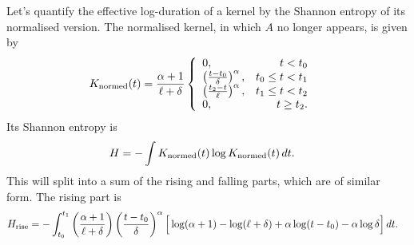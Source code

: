 \documentclass[a4paper, 12pt]{article}
\begin{document}
Let's quantify the effective log-duration of a kernel by the Shannon entropy of
its normalised version. The normalised kernel, in which $A$ no longer appears,
is given by
\begin{align}
K_{\rm normed}(t) &=
    \frac{\alpha+1}{\ell+\delta}
    \left\{
        \begin{array}{lr}
            0, & t < t_0 \\
            \left(\frac{t - t_0}{\delta}\right)^\alpha, & t_0 \leq t < t_1 \\
            \left(\frac{t_2 - t}{\ell}  \right)^\alpha, & t_1 \leq t < t_2 \\
            0, & t \geq t_2.
        \end{array}
    \right.
\end{align}
Its Shannon entropy is
\begin{align}
H &= -\int K_{\rm normed}(t) \log K_{\rm normed}(t) \, dt.
\end{align}
This will split into a sum of the rising and falling parts, which are of
similar form. The rising part is
\begin{align}
H_{\rm rise} &= -\int_{t_0}^{t_1}
                    \left(\frac{\alpha+1}{\ell+\delta}\right)
                    \left(\frac{t - t_0}{\delta}\right)^\alpha
                    \Big[
                        \log(\alpha + 1) - \log(\ell + \delta)
                        + \alpha\log(t - t_0) - \alpha\log\delta
                    \Big]
                    \, dt.
\end{align}
\end{document}
